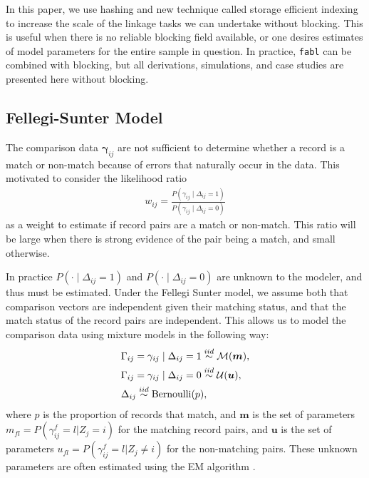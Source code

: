 \documentclass[ba]{imsart}
\begin{document}
In this paper, we use hashing and new technique called storage efficient indexing to increase the scale of the linkage tasks we can undertake without blocking. This is useful when there is no reliable blocking field available, or one desires estimates of model parameters for the entire sample in question. In practice, \texttt{fabl} can be combined with blocking, but all derivations, simulations, and case studies are presented here without blocking. 	

\subsection{Fellegi-Sunter Model}
\label{fellegi-sunter}
The comparison data $\bm{\gamma}_{ij}$ are not sufficient to determine whether a record is a match or non-match because of errors that naturally occur in the data. This motivated \cite{fellegi_theory_1969} to consider the likelihood ratio
\begin{align}
	\label{eqn:wts}
	w_{ij} = \frac{P(\gamma_{ij} \mid \Delta_{ij} = 1)}{P(\gamma_{ij} \mid \Delta_{ij} = 0)}
\end{align}
as a weight to estimate if record pairs are a match or non-match. This ratio will be large when there is strong evidence of the pair being a match, and small otherwise. 

In practice $P(\cdot \mid \Delta_{ij} = 1)$ and $P(\cdot \mid \Delta_{ij} = 0)$ are unknown to the modeler, and thus must be estimated. Under the Fellegi Sunter model, we assume both that comparison vectors are independent given their matching status, and that the match status of the record pairs are independent. This allows us to model 
the comparison data using mixture models in the following way:
\begin{align}
	&\Gamma_{ij} = \gamma_{ij} \mid \Delta_{ij} = 1 \stackrel{iid}{\sim} \mathcal{M}(\bm{m}), \\
	&\Gamma_{ij} = \gamma_{ij} \mid \Delta_{ij} = 0  \stackrel{iid}{\sim} \mathcal{U}(\bm{u}), \notag\\
	& \Delta_{ij}   \stackrel{iid}{\sim} \text{Bernoulli}(p), \notag
\end{align}
where $p$ is the proportion of records that match, and $\bm{m}$ is the set of parameters $m_{fl} = P(\gamma_{ij}^f = l|Z_j =i)$ for the matching record pairs, and $\bm{u}$ is the set of parameters $u_{fl} = P(\gamma_{ij}^f = l|Z_j \neq i)$ for the non-matching pairs. These unknown parameters are often estimated using the EM algorithm \citep{Winkler1988}. 
\end{document}
